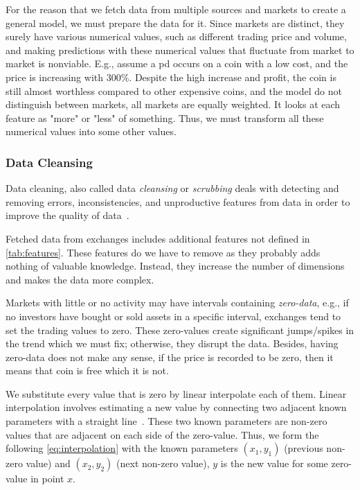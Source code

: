 For the reason that we fetch data from multiple sources and markets to create a general model, we must prepare the data for it. Since markets are distinct, they surely have various numerical values, such as different trading price and volume, and making predictions with these numerical values that fluctuate from market to market is nonviable. E.g., assume a \ac{pd} occurs on a coin with a low cost, and the price is increasing with $300\%$. Despite the high increase and profit, the coin is still almost worthless compared to other expensive coins, and the model do not distinguish between markets, all markets are equally weighted. It looks at each feature as "more" or "less" of something. Thus, we must transform all these numerical values into some other values.

\subsubsection{Data Cleansing}
Data cleaning, also called data \emph{cleansing} or \emph{scrubbing} deals with detecting and removing errors, inconsistencies, and unproductive features from data in order to improve the quality of data~\cite{data_cleaning}.

Fetched data from exchanges includes additional features not defined in \autoref{tab:features}. These features do we have to remove as they probably adds nothing of valuable knowledge. Instead, they increase the number of dimensions and makes the data more complex.

Markets with little or no activity may have intervals containing \emph{zero-data}, e.g., if no investors have bought or sold assets in a specific interval, exchanges tend to set the trading values to zero. These zero-values create significant jumps/spikes in the trend which we must fix; otherwise, they disrupt the data. Besides, having zero-data does not make any sense, if the price is recorded to be zero, then it means that coin is free which it is not.

We substitute every value that is zero by linear interpolate each of them. Linear interpolation involves estimating a new value by connecting two adjacent known parameters with a straight line~\cite{interpolate}. These two known parameters are non-zero values that are adjacent on each side of the zero-value. Thus, we form the following \autoref{eq:interpolation} with the known parameters $(x_1, y_1)$ (previous non-zero value) and $(x_2, y_2)$ (next non-zero value), $y$ is the new value for some zero-value in point $x$.

